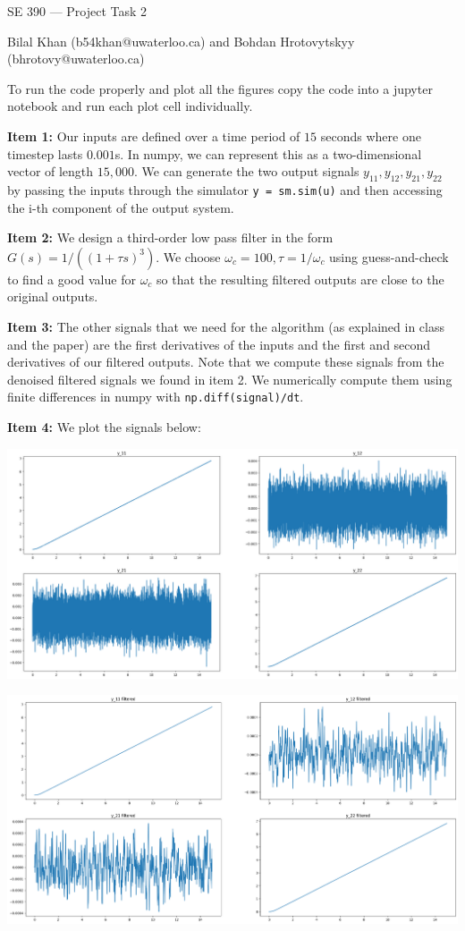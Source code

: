 \documentclass[11pt,legalpaper]{article}
\begin{document}
SE 390 — Project Task 2

Bilal Khan (b54khan@uwaterloo.ca) and Bohdan Hrotovytskyy (bhrotovy@uwaterloo.ca)

To run the code properly and plot all the figures copy the code into a jupyter notebook and run each plot cell individually.

\textbf{Item 1:} Our inputs are defined over a time period of $15$ seconds where one timestep lasts $0.001$s. In numpy, we can represent this as a two-dimensional vector of length $15,000$. We can generate the two output signals $y_{11}, y_{12}, y_{21}, y_{22}$ by passing the inputs through the simulator \texttt{y = sm.sim(u)} and then accessing the i-th component of the output system.

\textbf{Item 2:} We design a third-order low pass filter in the form $G(s) = 1 / ((1 + \tau s)^3)$. We choose $\omega_c = 100, \tau = 1 / \omega_c$ using guess-and-check to find a good value for $\omega_c$ so that the resulting filtered outputs are close to the original outputs.

\textbf{Item 3:} The other signals that we need for the algorithm (as explained in class and the paper) are the first derivatives of the inputs and the first and second derivatives of our filtered outputs. Note that we compute these signals from the denoised filtered signals we found in item 2. We numerically compute them using finite differences in numpy with \texttt{np.diff(signal)/dt}.

\textbf{Item 4:} We plot the signals below:

\includegraphics[width=450pt]{p2_1.png}

\includegraphics[width=450pt]{p2_2.png}
\end{document}
